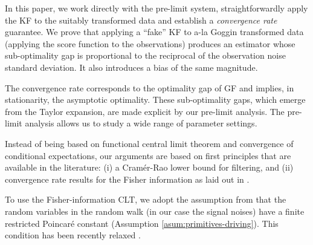  In this paper, we work directly with the pre-limit system, straightforwardly apply the KF to the suitably transformed data and establish a {\em convergence rate} guarantee. We prove that applying a ``fake'' KF to a-la Goggin transformed data (applying the score function to the observations) produces an estimator whose sub-optimality gap is proportional to the reciprocal of the observation noise standard deviation. It also introduces a bias of the same magnitude.  
 
 The convergence rate corresponds to the optimality gap of GF and implies, in stationarity, the asymptotic optimality. These sub-optimality gaps, which emerge from the Taylor expansion, are made explicit by our pre-limit analysis. The pre-limit analysis allows us to study a wide range of parameter settings. 
 
 Instead of being based on functional central limit theorem and convergence of conditional expectations, our arguments are based on first principles that are available in the literature: (i) a Cramér-Rao lower bound for filtering, and (ii) convergence rate results for the Fisher information as laid out in \cite{johnson2004information}. 
 
\iffalse Their argument rely explicitly on the Gaussianity. Relying on more recent results in the CLT literature, we expand the coverage to the non-Gaussian signal noise. Our arguments are direct and simple and cover the spectrum of regimes. As a final note, their model is seemingly different from ours. In their model the signal is a continuous time process and the observation are spaced out and discrete. The variance of the observation noise depends on the interval between consecutive observations and the assumption is that over inter-observation period of length $\Delta$, the observation noise has standard deviation of magnitude $\sqrt{\Delta}$ (with $\Delta$ small). In our case, we consider a discrete time system and the scaling correspond to the scaling of the noise terms in both the signal and the observation. However, their results can be equivalently formulated within our discrete time framework.  \fi 

To use the Fisher-information CLT, we adopt the assumption from \cite{johnson2004information} that the random variables in the random walk (in our case the signal noises) have a finite restricted Poincaré constant (Assumption \ref{asum:primitives-driving}). This condition has been recently relaxed \cite{bobkov_Fisher_2014}. 
\vspace*{0.2cm} 


